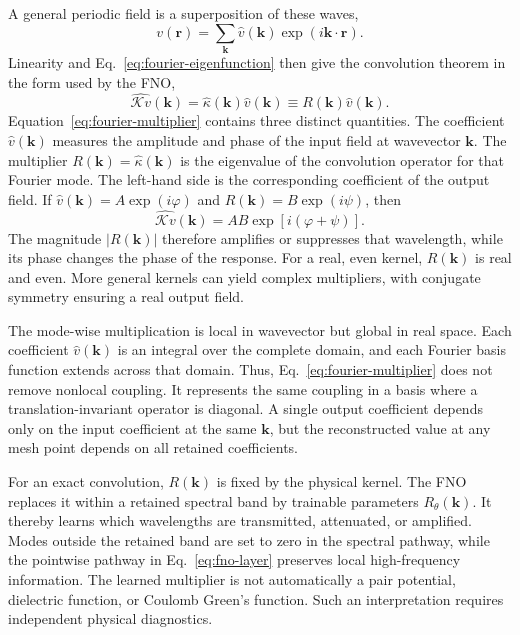 \documentclass[11pt]{article}
\begin{document}
A general periodic field is a superposition of these waves,
\begin{equation}
 v(\mathbf r)=\sum_{\mathbf k}\widehat v(\mathbf k)
 \exp(i\mathbf k\cdot\mathbf r).
 \label{eq:fourier-expansion}
\end{equation}
Linearity and Eq.~\eqref{eq:fourier-eigenfunction} then give the convolution
theorem in the form used by the FNO,
\begin{equation}
 \widehat{\mathcal K v}(\mathbf k)
 =\widehat\kappa(\mathbf k)\widehat v(\mathbf k)
 \equiv R(\mathbf k)\widehat v(\mathbf k).
 \label{eq:fourier-multiplier}
\end{equation}
Equation~\eqref{eq:fourier-multiplier} contains three distinct quantities.
The coefficient \(\widehat v(\mathbf k)\) measures the amplitude and phase of
the input field at wavevector \(\mathbf k\). The multiplier
\(R(\mathbf k)=\widehat\kappa(\mathbf k)\) is the eigenvalue of the convolution
operator for that Fourier mode. The left-hand side is the corresponding
coefficient of the output field. If
\(\widehat v(\mathbf k)=A\exp(i\varphi)\) and
\(R(\mathbf k)=B\exp(i\psi)\), then
\[
 \widehat{\mathcal K v}(\mathbf k)=AB\exp[i(\varphi+\psi)].
\]
The magnitude \(|R(\mathbf k)|\) therefore amplifies or suppresses that
wavelength, while its phase changes the phase of the response. For a real,
even kernel, \(R(\mathbf k)\) is real and even. More general kernels can yield
complex multipliers, with conjugate symmetry ensuring a real output field.

The mode-wise multiplication is local in wavevector but global in real space.
Each coefficient \(\widehat v(\mathbf k)\) is an integral over the complete
domain, and each Fourier basis function extends across that domain. Thus,
Eq.~\eqref{eq:fourier-multiplier} does not remove nonlocal coupling. It
represents the same coupling in a basis where a translation-invariant operator
is diagonal. A single output coefficient depends only on the input coefficient
at the same \(\mathbf k\), but the reconstructed value at any mesh point
depends on all retained coefficients.

For an exact convolution, \(R(\mathbf k)\) is fixed by the physical kernel.
The FNO replaces it within a retained spectral band by trainable parameters
\(R_\theta(\mathbf k)\). It thereby learns which wavelengths are transmitted,
attenuated, or amplified. Modes outside the retained band are set to zero in
the spectral pathway, while the pointwise pathway in Eq.~\eqref{eq:fno-layer}
preserves local high-frequency information. The learned multiplier is not
automatically a pair potential, dielectric function, or Coulomb Green's
function. Such an interpretation requires independent physical diagnostics.
\end{document}

